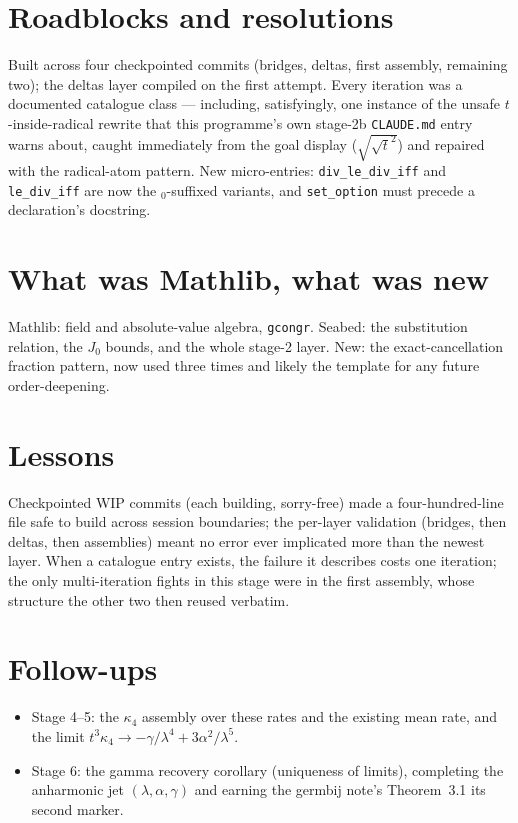 \documentclass[11pt]{article}
\begin{document}
\section{Roadblocks and resolutions}

Built across four checkpointed commits (bridges, deltas, first
assembly, remaining two); the deltas layer compiled on the first
attempt. Every iteration was a documented catalogue class ---
including, satisfyingly, one instance of the unsafe
$t$-inside-radical rewrite that this programme's own stage-2b
\texttt{CLAUDE.md} entry warns about, caught immediately from the goal
display ($\sqrt{\sqrt t^2}$) and repaired with the radical-atom
pattern. New micro-entries: \texttt{div\_le\_div\_iff} and
\texttt{le\_div\_iff} are now the $_0$-suffixed variants, and
\texttt{set\_option} must precede a declaration's docstring.

\section{What was Mathlib, what was new}

Mathlib: field and absolute-value algebra, \texttt{gcongr}. Seabed: the
substitution relation, the $J_0$ bounds, and the whole stage-2 layer.
New: the exact-cancellation fraction pattern, now used three times and
likely the template for any future order-deepening.

\section{Lessons}

Checkpointed WIP commits (each building, sorry-free) made a
four-hundred-line file safe to build across session boundaries; the
per-layer validation (bridges, then deltas, then assemblies) meant no
error ever implicated more than the newest layer. When a catalogue
entry exists, the failure it describes costs one iteration; the only
multi-iteration fights in this stage were in the first assembly, whose
structure the other two then reused verbatim.

\section{Follow-ups}

\begin{itemize}
\item Stage 4--5: the $\kappa_4$ assembly over these rates and the
existing mean rate, and the limit
$t^3\kappa_4 \to -\gamma/\lambda^4 + 3\alpha^2/\lambda^5$.
\item Stage 6: the gamma recovery corollary (uniqueness of limits),
completing the anharmonic jet $(\lambda, \alpha, \gamma)$ and earning
the germbij note's Theorem~3.1 its second marker.
\end{itemize}
\end{document}
